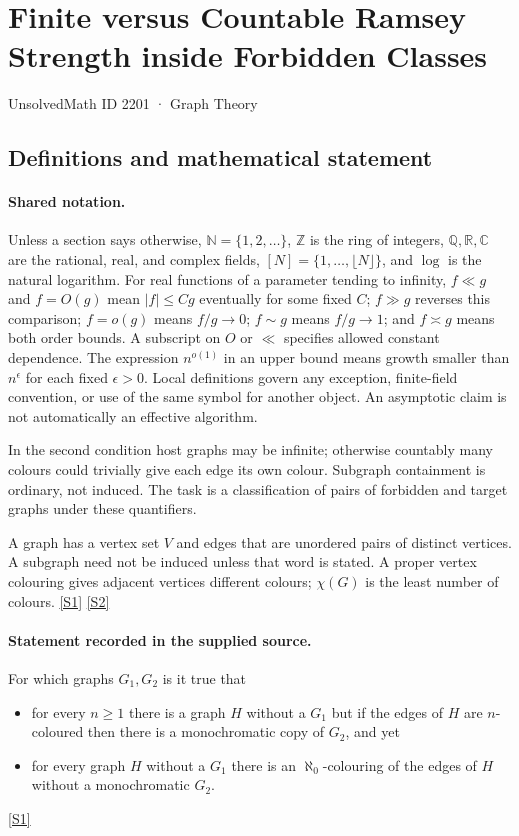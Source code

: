 \documentclass[11pt,a4paper]{article}
\newcommand{\N}{\mathbb{N}}
\newcommand{\Z}{\mathbb{Z}}
\newcommand{\Q}{\mathbb{Q}}
\newcommand{\R}{\mathbb{R}}
\newcommand{\C}{\mathbb{C}}
\newcommand{\sref}[2]{\hyperlink{source:#1:#2}{[S#2]}}
\begin{document}

\setcounter{section}{2200}

\section{Finite versus Countable Ramsey Strength inside Forbidden Classes}\label{2201}

{\small\sffamily UnsolvedMath ID 2201 · Graph Theory}

\subsection{Definitions and mathematical statement}

\paragraph{Shared notation.}Unless a section says otherwise, $\N=\{1,2,\ldots\}$,
$\Z$ is the ring of integers, $\Q,\R,\C$ are the rational, real, and complex
fields, $[N]=\{1,\ldots,\lfloor N\rfloor\}$, and $\log$ is the natural
logarithm. For real functions of a parameter tending to infinity,
$f\ll g$ and $f=O(g)$ mean $|f|\leq Cg$ eventually for some fixed $C$;
$f\gg g$ reverses this comparison; $f=o(g)$ means $f/g\to0$;
$f\sim g$ means $f/g\to1$; and $f\asymp g$ means both order bounds.
A subscript on $O$ or $\ll$ specifies allowed constant dependence.
The expression $n^{o(1)}$ in an upper bound means growth smaller than
$n^\epsilon$ for each fixed $\epsilon>0$. Local definitions govern any
exception, finite-field convention, or use of the same symbol for another
object. An asymptotic claim is not automatically an effective algorithm.



In the second condition host graphs may be infinite; otherwise countably many colours could trivially give each edge its own colour. Subgraph containment is ordinary, not induced. The task is a classification of pairs of forbidden and target graphs under these quantifiers.

A graph has a vertex set $V$ and edges that are unordered pairs of distinct vertices. A subgraph need not be induced unless that word is stated. A proper vertex colouring gives adjacent vertices different colours; $\chi(G)$ is the least number of colours. \sref{2201}{1} \sref{2201}{2}

\paragraph{Statement recorded in the supplied source.}
For which graphs $G_1,G_2$ is it true that
\begin{itemize}
\item  for every $n\geq 1$ there is a graph $H$ without a $G_1$ but if the edges of $H$ are $n$-coloured then there is a monochromatic copy of $G_2$, and yet
\item  for every graph $H$ without a $G_1$ there is an $\aleph_0$-colouring of the edges of $H$ without a monochromatic $G_2$.
\end{itemize} \sref{2201}{1}
\end{document}
